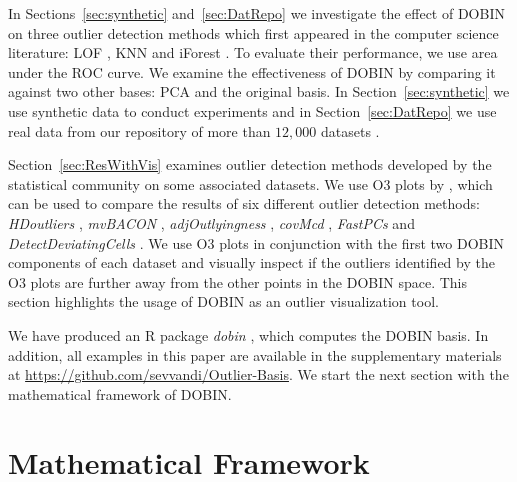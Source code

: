 \documentclass[a4paper,12pt]{article}
\begin{document}
In Sections~\ref{sec:synthetic} and~\ref{sec:DatRepo} we investigate the effect of DOBIN on three outlier detection methods which first appeared in the computer science literature: LOF \citep{breunig2000lof}, KNN \citep{ramaswamy2000efficient} and iForest \citep{liu2008isolation}. To evaluate their performance, we use area under the ROC curve. We examine the effectiveness of DOBIN by comparing it against two other bases: PCA and the original basis. In Section~\ref{sec:synthetic} we use synthetic data to conduct experiments and in Section~\ref{sec:DatRepo} we use real data from our repository of more than $12,000$ datasets \citep{datasets}.

Section~\ref{sec:ResWithVis} examines outlier detection methods developed by the statistical community on some associated datasets. We use O3 plots by \cite{unwin2019multivariate}, which can be used to compare the results of six different outlier detection methods: \textit{HDoutliers} \citep{wilkinson2017visualizing}, \textit{mvBACON} \citep{billor2000bacon}, \textit{adjOutlyingness} \citep{brys2005robustification}, \textit{covMcd} \citep{rousseeuw1999fast} , \textit{FastPCs} \citep{vakili2014finding} and \textit{DetectDeviatingCells} \citep{rousseeuw2018detecting}. We use O3 plots in conjunction with the first two DOBIN components of each dataset and visually inspect if the outliers identified by the O3 plots are further away from the other points in the DOBIN space. This section highlights the usage of DOBIN as an outlier visualization tool.

We have produced an R package \textit{dobin} \citep{dobin}, which computes the DOBIN basis. In addition, all examples in this paper are available in the supplementary materials at \url{https://github.com/sevvandi/Outlier-Basis}. We start the next section with the mathematical framework of DOBIN. %

\section{Mathematical Framework}\label{sec:MathFrame}
\end{document}
